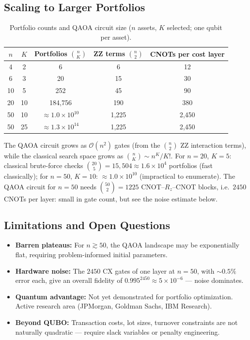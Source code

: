 \documentclass[a4paper,11pt]{article}
\begin{document}
\subsection{Scaling to Larger Portfolios}

\begin{table}[H]
\centering
\caption{Portfolio counts and QAOA circuit size ($n$ assets, $K$ selected;
one qubit per asset).}
\label{tab:scaling}
\begin{tabular}{ccccc}
    \toprule
    $n$ & $K$ & Portfolios $\binom{n}{K}$ & ZZ terms $\binom{n}{2}$ & CNOTs per cost layer \\
    \midrule
    4  & 2  & 6                         & 6     & 12    \\
    6  & 3  & 20                        & 15    & 30    \\
    10 & 5  & 252                       & 45    & 90    \\
    20 & 10 & 184{,}756                 & 190   & 380   \\
    50 & 10 & $\approx 1.0 \times 10^{10}$ & 1{,}225 & 2{,}450 \\
    50 & 25 & $\approx 1.3 \times 10^{14}$ & 1{,}225 & 2{,}450 \\
    \bottomrule
\end{tabular}
\end{table}

The QAOA circuit grows as $\mathcal{O}(n^2)$ gates (from the $\binom{n}{2}$
ZZ interaction terms), while the classical search space grows as
$\binom{n}{K} \sim n^K / K!$. For $n=20$, $K=5$: classical brute-force
checks $\binom{20}{5} = 15{,}504 \approx 1.6 \times 10^4$ portfolios (fast
classically); for $n=50$, $K=10$: $\approx 1.0 \times 10^{10}$ (impractical
to enumerate). The QAOA circuit for $n=50$ needs $\binom{50}{2} = 1225$
CNOT--$R_z$--CNOT blocks, i.e.\ $2450$ CNOTs per layer: small in gate count,
but see the noise estimate below.

\subsection{Limitations and Open Questions}

\begin{itemize}
    \item \textbf{Barren plateaus:} For $n \gtrsim 50$, the QAOA landscape
          may be exponentially flat, requiring problem-informed initial
          parameters.
    \item \textbf{Hardware noise:} The $2450$ CX gates of one layer at
          $n=50$, with $\sim\!0.5\%$ error each, give an overall fidelity of
          $0.995^{2450} \approx 5 \times 10^{-6}$ — noise dominates.
    \item \textbf{Quantum advantage:} Not yet demonstrated for portfolio
          optimization. Active research area (JPMorgan, Goldman Sachs,
          IBM Research).
    \item \textbf{Beyond QUBO:} Transaction costs, lot sizes, turnover
          constraints are not naturally quadratic — require slack variables
          or penalty engineering.
\end{itemize}
\end{document}
